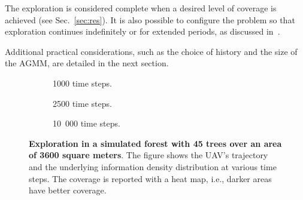 \documentclass[letterpaper, 10 pt, conference, twoside]{IEEEtran}
\theoremstyle{definition}
\begin{document}
The exploration is considered complete when a desired level of coverage is achieved (see Sec.~\ref{sec:res}). It is also possible to configure the problem so that exploration continues indefinitely or for extended periods, as discussed in~\cite{seewald2024energy}. 

Additional practical considerations, such as the choice of history and the size of the AGMM, are detailed in the next section.


\begin{figure}[t!]
  \centering
  \vspace*{-.1cm}
  \begin{subfigure}[t]{\linewidth}
  \hspace*{-.0cm}
  \caption{%
  1000 time steps.}
  \label{fig:1-1}
  \end{subfigure}
  \begin{subfigure}[t]{\linewidth}
  \hspace*{-.05cm}
  \caption{%
  2500 time steps.}
  \label{fig:1-2}
  \end{subfigure}
  \begin{subfigure}[t]{\linewidth}
  \hspace*{-.05cm}
  \caption{%
  10~000 time steps.}
  \label{fig:1-3}
  \end{subfigure}
  \caption{\textbf{Exploration in a simulated forest with 45 trees over an area of 3600 square meters}. The figure shows the UAV's trajectory and the underlying information density distribution at various time steps. The coverage is reported with a heat map, i.e., darker areas have better coverage.}
  \vspace*{-.4cm}
  \label{fig:1}
\end{figure}
\end{document}
